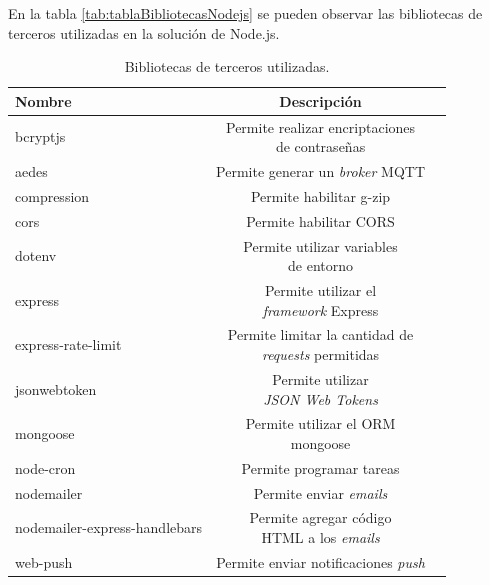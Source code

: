 En la tabla \ref{tab:tablaBibliotecasNodejs} se pueden observar las bibliotecas de terceros utilizadas en la solución de Node.js.

\begin{table}[H]
	\centering
	\caption[Bibliotecas de terceros utilizadas]{Bibliotecas de terceros utilizadas.}
	\begin{tabular}{l c c}    
		\toprule
		\textbf{Nombre} & \textbf{Descripción}\\
		\midrule
		bcryptjs \citep{WEBSITE:BCRYPTJS} & \shortstack{Permite realizar encriptaciones \citep{WEBSITE:ENCRIPTACION} \\ de contraseñas}\\	
		aedes \citep{WEBSITE:AEDES} & Permite generar un \emph{broker} MQTT \\	
		compression \citep{WEBSITE:COMPRESSIONLBIRARY} & Permite habilitar g-zip\\	
		cors \citep{WEBSITE:CORSLIBRARY} & Permite habilitar CORS \citep{WEBSITE:CORS} \\	
		dotenv \citep{WEBSITE:DOTENV} & \shortstack{Permite utilizar variables \\  de entorno \citep{WEBSITE:VARIABLESDEENTORNO}} \\	
		express \citep{WEBSITE:EXPRESSLIBRARY} & \shortstack{Permite utilizar el \\ \emph{framework} Express \citep{WEBSITE:EXPRESSJS}} \\	
		express-rate-limit \citep{WEBSITE:EXPRESSRATELIMIT} & \shortstack{Permite limitar la cantidad de \\ \textit{requests} permitidas} \\	
		jsonwebtoken \citep{WEBSITE:JSONWEBTOKENLIBRARY} & \shortstack{Permite utilizar \\ \emph{JSON Web Tokens} \citep{WEBSITE:JWT}} \\	
		mongoose \citep{WEBSITE:MONGOOSELIBRARY} & \shortstack{Permite utilizar el ORM \citep{WEBSITE:ORM} \\ mongoose \citep{WEBSITE:MONGOOSEJS}} \\	
		node-cron \citep{WEBSITE:NODECRON} & Permite programar tareas \\	
		nodemailer \citep{WEBSITE:NODEMAILER} & Permite enviar \textit{emails} \\	
		nodemailer-express-handlebars \citep{WEBSITE:NODEMAILEREXPRESSHANDLEBARS}& \shortstack{Permite agregar código \\ HTML a los \textit{emails}} \\	
		web-push \citep{WEBSITE:WEBPUSH} & Permite enviar notificaciones \emph{push}\\

\end{tabular}
\end{table}
